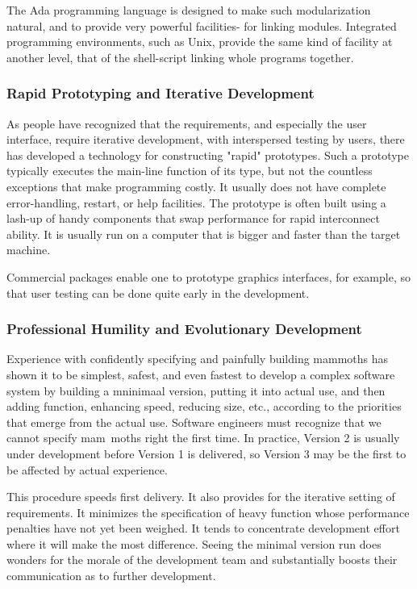 \documentclass[12pt]{article}
\begin{document}
The Ada programming language is designed to make such modularization natural,
and to provide very powerful facilities- for linking modules. Integrated
programming environments, such as Unix, provide the same kind of facility at
another level, that of the shell-script linking whole programs together.

\subsubsection*{Rapid Prototyping and Iterative Development}

As people have recognized that the requirements, and especially the user
interface, require iterative development, with interspersed testing by users,
there has developed a technology for constructing "rapid" prototypes. Such a
prototype typically executes the main-line function of its type, but not the
countless exceptions that make programming costly. It usually does not have
complete error-handling, restart, or help facilities. The prototype is often
built using a lash-up of handy components that swap performance for rapid
interconnect ability. It is usually run on a computer that is bigger and faster
than the target machine.

Commercial packages enable one to prototype graphics interfaces, for example,
so that user testing can be done quite early in the development.

\subsubsection*{Professional Humility and Evolutionary Development}

Experience with confidently specifying and painfully building mammoths has
shown it to be simplest, safest, and even fastest to develop a complex software
system by building a mninimaal version, putting it into actual use, and then
adding function, enhancing speed, reducing size, etc., according to the
priorities that emerge from the actual use. Software engineers must recognize
that we cannot specify mam~moths right the first time. In practice, Version 2
is usually under development before Version 1 is delivered, so Version 3 may be
the first to be affected by actual experience.

This procedure speeds first delivery. It also provides for the iterative
setting of requirements. It minimizes the specification of heavy function whose
performance penalties have not yet been weighed. It tends to concentrate
development effort where it will make the most difference. Seeing the minimal
version run does wonders for the morale of the development team and
substantially boosts their communication as to further development.
\end{document}
